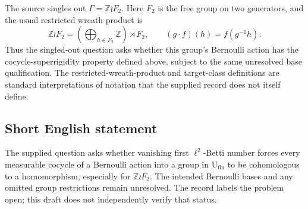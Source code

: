 \documentclass[11pt]{article}
\begin{document}
The source singles out \(\Gamma=\mathbb Z\wr F_2\). Here \(F_2\) is the free group on two generators, and the usual restricted wreath product is
\[
\mathbb Z\wr F_2
=\left(\bigoplus_{h\in F_2}\mathbb Z\right)\rtimes F_2,
\qquad
(g\cdot f)(h)=f(g^{-1}h).
\]
Thus the singled-out question asks whether this group's Bernoulli action has the cocycle-superrigidity property defined above, subject to the same unresolved base qualification. The restricted-wreath-product and target-class definitions are standard interpretations of notation that the supplied record does not itself define.
\subsection{Short English statement}
The supplied question asks whether vanishing first \(\ell^2\)-Betti number forces every measurable cocycle of a Bernoulli action into a group in \(\mathrm{U}_{\mathrm{fin}}\) to be cohomologous to a homomorphism, especially for \(\mathbb Z\wr F_2\). The intended Bernoulli bases and any omitted group restrictions remain unresolved. The record labels the problem open; this draft does not independently verify that status.
\end{document}
